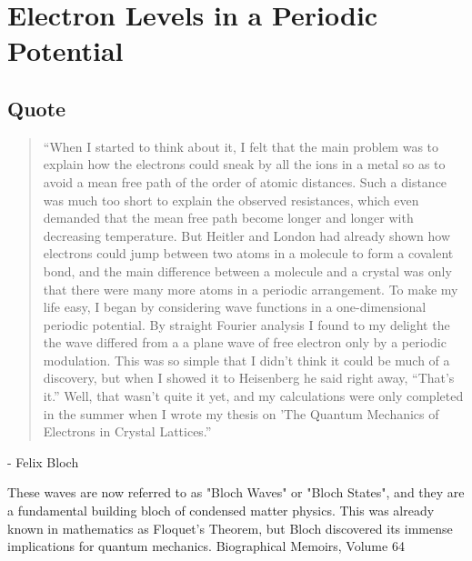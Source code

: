 \chapter{Electron Levels in a Periodic Potential}

\listoftodos

\section{Quote}




\begin{quotation}
``When I started to think about it, I felt that the main problem was to explain how the electrons could sneak by all the ions in a metal so as to avoid a mean free path of the order of atomic distances. Such a distance was much too short to explain the observed resistances, which even demanded that the mean free path become longer and longer with decreasing temperature. But Heitler and London had already shown how electrons could jump between two atoms in a molecule to form a covalent bond, and the main difference between a molecule and a crystal was only that there were many more atoms in a periodic arrangement. To make my life easy, I began by considering wave functions in a one-dimensional periodic potential. By straight Fourier analysis I found to my delight the the wave differed from a a plane wave of free electron only by a periodic modulation.
This was so simple that I didn’t think it could be much of a discovery, but when I showed it to Heisenberg he said right away, “That’s it.” Well, that wasn’t quite it yet, and my calculations were only completed in the summer when I wrote my thesis on 'The Quantum Mechanics of Electrons in Crystal Lattices.''
\end{quotation}
- Felix Bloch


These waves are now referred to as "Bloch Waves" or "Bloch States", and they are a fundamental building bloch of condensed matter physics. This was already known in mathematics as Floquet's Theorem, but Bloch discovered its immense implications for quantum mechanics.
Biographical Memoirs, Volume 64

